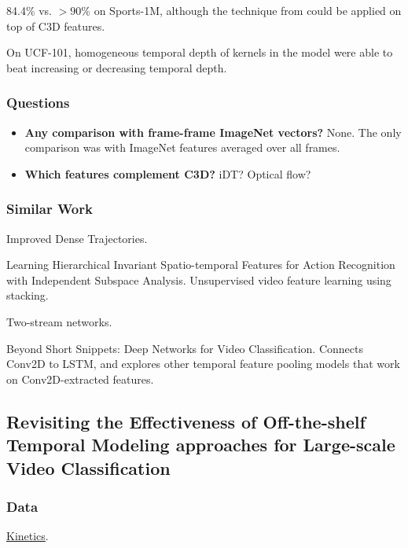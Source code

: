 \documentclass[a4paper, 12pt]{article}
\begin{document}
84.4\% vs. $> 90\%$ on Sports-1M, although the technique
from\citet{DBLP:journals/corr/NgHVVMT15} could be applied on top of C3D
features.

On UCF-101, homogeneous temporal depth of kernels in the model were able to
beat increasing or decreasing temporal depth.

\subsubsection{Questions}

\begin{itemize}
\item \textbf{Any comparison with frame-frame ImageNet vectors?} None. The only
        comparison was with ImageNet features averaged over all frames.

\item \textbf{Which features complement C3D?} iDT\@? Optical flow?
\end{itemize}

\subsubsection{Similar Work}

Improved Dense Trajectories\citet{Wang2013}.

Learning Hierarchical Invariant Spatio-temporal Features for Action Recognition
with Independent Subspace Analysis\citet{Le:2011:LHI:2191740.2192108}.
Unsupervised video feature learning using stacking.

Two-stream networks\citet{DBLP:journals/corr/SimonyanZ14}.

Beyond Short Snippets: Deep Networks for Video
Classification\citet{DBLP:journals/corr/NgHVVMT15}. Connects Conv2D to LSTM, and
explores other temporal feature pooling models that work on Conv2D-extracted
features.


\subsection{Revisiting the Effectiveness of Off-the-shelf Temporal Modeling
            approaches for Large-scale Video
            Classification\citet{2017arXiv170803805B}}

\subsubsection{Data}

\hyperref[kinetics]{Kinetics}.
\end{document}
